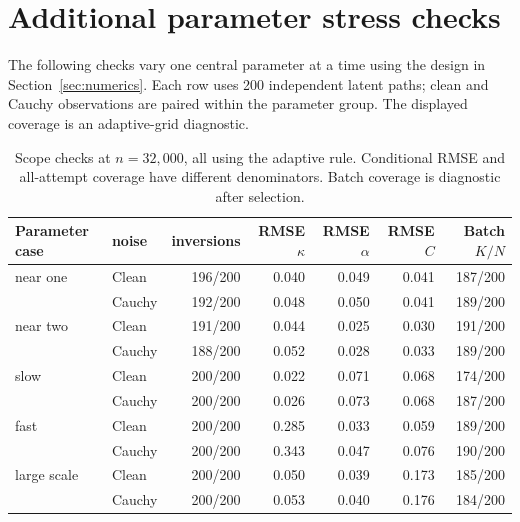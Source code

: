 \documentclass[11pt,a4paper]{article}
\theoremstyle{remark}\newtheorem{remark}[theorem]{Remark}
\begin{document}
\section{Additional parameter stress checks}\label{app:additional}
The following checks vary one central parameter at a time using the design in Section~\ref{sec:numerics}. Each row uses 200 independent latent paths; clean and Cauchy observations are paired within the parameter group. The displayed coverage is an adaptive-grid diagnostic.

\begin{table}[htbp]\centering\small
\caption{Scope checks at $n=32{,}000$, all using the adaptive rule. Conditional RMSE and all-attempt coverage have different denominators. Batch coverage is diagnostic after selection.}\label{tab:scope}
\begin{tabular}{llrrrrr}\toprule
Parameter case & noise & inversions & RMSE $\kappa$ & RMSE $\alpha$ & RMSE $C$ & Batch $K/N$\\ \midrule
near one & Clean & 196/200 & 0.040 & 0.049 & 0.041 & 187/200 \\
 & Cauchy & 192/200 & 0.048 & 0.050 & 0.041 & 189/200 \\
\addlinespace[0.6ex]
near two & Clean & 191/200 & 0.044 & 0.025 & 0.030 & 191/200 \\
 & Cauchy & 188/200 & 0.052 & 0.028 & 0.033 & 189/200 \\
\addlinespace[0.6ex]
slow & Clean & 200/200 & 0.022 & 0.071 & 0.068 & 174/200 \\
 & Cauchy & 200/200 & 0.026 & 0.073 & 0.068 & 187/200 \\
\addlinespace[0.6ex]
fast & Clean & 200/200 & 0.285 & 0.033 & 0.059 & 189/200 \\
 & Cauchy & 200/200 & 0.343 & 0.047 & 0.076 & 190/200 \\
\addlinespace[0.6ex]
large scale & Clean & 200/200 & 0.050 & 0.039 & 0.173 & 185/200 \\
 & Cauchy & 200/200 & 0.053 & 0.040 & 0.176 & 184/200 \\
\bottomrule\end{tabular}
\end{table}
\end{document}
